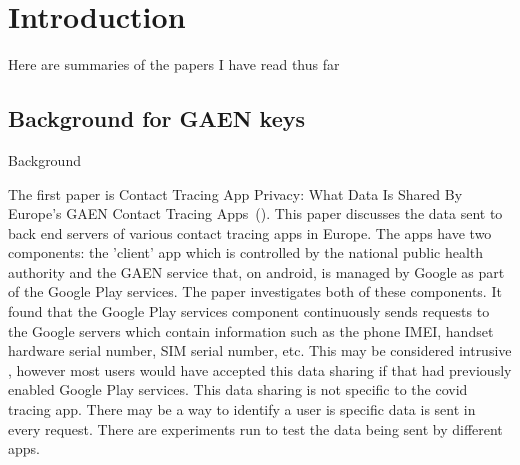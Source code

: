 \chapter{Introduction}

Here are summaries of the papers I have read thus far

\section{Background for GAEN keys}
\label{sec:BackgroundGAENKeys}

Background

The first paper is Contact Tracing App Privacy: What Data Is Shared
By Europe’s GAEN Contact Tracing Apps~(\cite{9488728}). This paper discusses the data sent to back end servers of various contact tracing apps in Europe. The apps have two components: the 'client' app which is controlled by the national public health authority and the GAEN service that, on android, is managed by Google as part of the Google Play services. The paper investigates both of these components. It found that the Google Play services component continuously sends requests to the Google servers which contain information such as the phone IMEI, handset hardware serial number, SIM serial number, etc. This may be considered intrusive , however most users would have accepted this data sharing if that had previously enabled Google Play services. This data sharing is not specific to the covid tracing app. There may be a way to identify a user is  specific data is sent in every request. There are experiments run to test the data being sent by different apps. 

